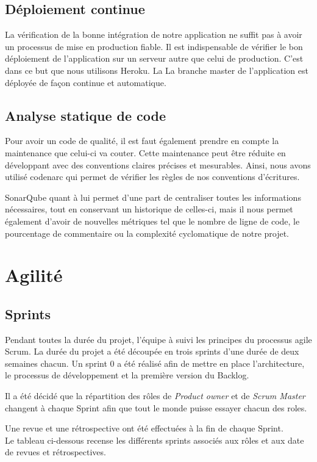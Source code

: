 \documentclass[12pt,a4paper,oneside]{book}
\begin{document}
	\section{Déploiement continue}
	La vérification de la bonne intégration de notre application ne suffit pas à avoir un processus de mise en production fiable. Il est indispensable de vérifier le bon déploiement de l'application sur un serveur autre que celui de production. C'est dans ce but que nous utilisons Heroku. La La branche master de l'application est déployée de façon continue et automatique.
	
	\section{Analyse statique de code}
	Pour avoir un code de qualité, il est faut également prendre en compte la maintenance que celui-ci va couter. Cette maintenance peut être réduite en développant avec des conventions claires précises et mesurables. 
	Ainsi, nous avons utilisé codenarc qui permet de vérifier les règles de nos conventions d’écritures. 
	
	SonarQube quant à lui permet d’une part de centraliser toutes les informations nécessaires, tout en conservant un historique de celles-ci, mais il nous permet également d’avoir de nouvelles métriques tel que le nombre de ligne de code, le pourcentage de commentaire ou la complexité cyclomatique de notre projet. 
	
	\chapter{Agilité}
	\section{Sprints}	
	Pendant toutes la durée du projet, l’équipe à suivi les principes du processus agile Scrum. La durée du projet a été découpée en trois sprints d’une durée de deux semaines chacun. Un sprint 0 a été réalisé afin de mettre en place l’architecture, le processus de développement et la première version du Backlog.
	
	Il a été décidé que la répartition des rôles de \textit{Product owner }et de \textit{Scrum Master }changent à chaque Sprint afin que tout le monde puisse essayer chacun des roles.
	
	Une revue et une rétrospective ont été effectuées à la fin de chaque Sprint.\\
	Le tableau ci-dessous recense les différents sprints associés aux rôles et aux date de revues et rétrospectives.
\end{document}
